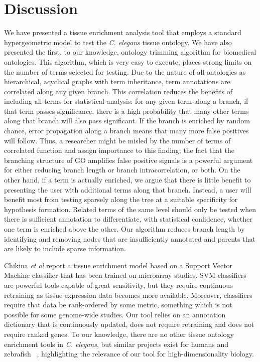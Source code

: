 \documentclass[linenumbers, doublespacing]{bmcart}
\begin{document}
\section*{Discussion}
We have presented a tissue enrichment analysis tool that employs a standard hypergeometric model to test the   \emph{C. elegans} tissue ontology. We have also presented the first, to our knowledge, ontology trimming algorithm for biomedical ontologies. This algorithm, which is very easy to execute, places strong limits on the number of terms selected for testing. Due to the nature of all ontologies as hierarchical, acyclical graphs with term inheritance, term annotations are correlated along any given branch. This correlation reduces the benefits of including all terms for statistical analysis: for any given term along a branch, if that term passes significance, there is a high probability that many other terms along that branch will also pass significant. If the branch is enriched by random chance, error propagation along a branch means that many more false positives will follow. Thus, a researcher might be misled by the number of terms of correlated function and assign importance to this finding; the fact that the branching structure of GO amplifies false positive signals is a powerful argument for either reducing branch length or branch intracorrelation, or both. On the other hand, if a term is actually enriched, we argue that there is little benefit to presenting the user with additional terms along that branch. Instead, a user will benefit most from testing sparsely along the tree at a suitable specificity for hypothesis formation. Related terms of the same level should only be tested when there is sufficient annotation to differentiate, with statistical confidence, whether one term is enriched above the other. Our algorithm reduces branch length by identifying and removing nodes that are insufficiently annotated and parents that are likely to include sparse information.

Chikina \emph{et al}  \cite{Chikina2009} report a tissue enrichment model based on a Support Vector Machine classifier that has been trained on microarray studies. SVM classifiers are powerful tools capable of great sensitivity, but they require continuous retraining as tissue expression data becomes more available. Moreover, classifiers require that data be rank-ordered by some metric, something which is not possible for some genome-wide studies. Our tool relies on an annotation dictionary that is continuously updated, does not require retraining and does not require ranked genes. To our knowledge, there are no other tissue ontology enrichment tools in   \emph{C. elegans}, but similar projects exist for humans and zebrafish ~\cite{Lee2013, Prykhozhij2013}, highlighting the relevance of our tool for high-dimensionality biology.
\end{document}

